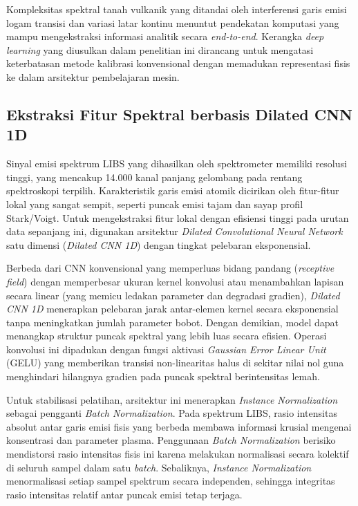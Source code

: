 Kompleksitas spektral tanah vulkanik yang ditandai oleh interferensi garis emisi logam transisi dan variasi latar kontinu menuntut pendekatan komputasi yang mampu mengekstraksi informasi analitik secara \textit{end-to-end}. Kerangka \textit{deep learning} yang diusulkan dalam penelitian ini dirancang untuk mengatasi keterbatasan metode kalibrasi konvensional dengan memadukan representasi fisis ke dalam arsitektur pembelajaran mesin.

\subsection{Ekstraksi Fitur Spektral berbasis Dilated CNN 1D} \label{subsec:bab2_dilated_cnn}

Sinyal emisi spektrum LIBS yang dihasilkan oleh spektrometer memiliki resolusi tinggi, yang mencakup 14.000 kanal panjang gelombang pada rentang spektroskopi terpilih. Karakteristik garis emisi atomik dicirikan oleh fitur-fitur lokal yang sangat sempit, seperti puncak emisi tajam dan sayap profil Stark/Voigt. Untuk mengekstraksi fitur lokal dengan efisiensi tinggi pada urutan data sepanjang ini, digunakan arsitektur \textit{Dilated Convolutional Neural Network} satu dimensi (\textit{Dilated CNN 1D}) dengan tingkat pelebaran eksponensial.

Berbeda dari CNN konvensional yang memperluas bidang pandang (\textit{receptive field}) dengan memperbesar ukuran kernel konvolusi atau menambahkan lapisan secara linear (yang memicu ledakan parameter dan degradasi gradien), \textit{Dilated CNN 1D} menerapkan pelebaran jarak antar-elemen kernel secara eksponensial tanpa meningkatkan jumlah parameter bobot. Dengan demikian, model dapat menangkap struktur puncak spektral yang lebih luas secara efisien. Operasi konvolusi ini dipadukan dengan fungsi aktivasi \textit{Gaussian Error Linear Unit} (GELU) yang memberikan transisi non-linearitas halus di sekitar nilai nol guna menghindari hilangnya gradien pada puncak spektral berintensitas lemah.

Untuk stabilisasi pelatihan, arsitektur ini menerapkan \textit{Instance Normalization} sebagai pengganti \textit{Batch Normalization}. Pada spektrum LIBS, rasio intensitas absolut antar garis emisi fisis yang berbeda membawa informasi krusial mengenai konsentrasi dan parameter plasma. Penggunaan \textit{Batch Normalization} berisiko mendistorsi rasio intensitas fisis ini karena melakukan normalisasi secara kolektif di seluruh sampel dalam satu \textit{batch}. Sebaliknya, \textit{Instance Normalization} menormalisasi setiap sampel spektrum secara independen, sehingga integritas rasio intensitas relatif antar puncak emisi tetap terjaga. 

